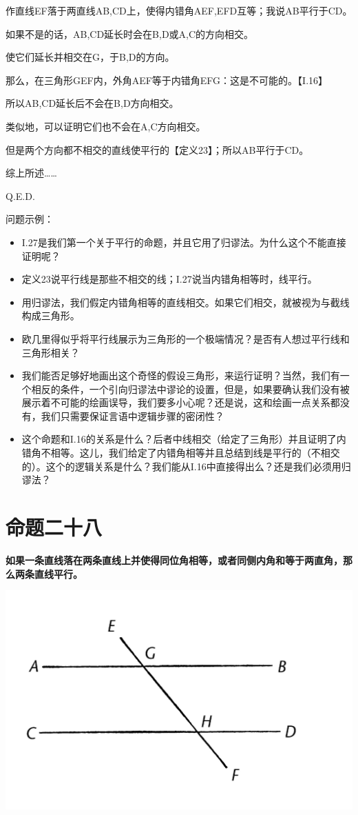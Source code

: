 \documentclass[
]{book}
\providecommand{\tightlist}{%
  \setlength{\itemsep}{0pt}\setlength{\parskip}{0pt}}
\begin{document}
作直线EF落于两直线AB,CD上，使得内错角AEF,EFD互等；我说AB平行于CD。

如果不是的话，AB,CD延长时会在B,D或A,C的方向相交。

使它们延长并相交在G，于B,D的方向。

那么，在三角形GEF内，外角AEF等于内错角EFG：这是不可能的。【I.16】

所以AB,CD延长后不会在B,D方向相交。

类似地，可以证明它们也不会在A,C方向相交。

但是两个方向都不相交的直线使平行的【定义23】；所以AB平行于CD。

综上所述\ldots\ldots{}

Q.E.D.

问题示例：

\begin{itemize}
\tightlist
\item
  I.27是我们第一个关于平行的命题，并且它用了归谬法。为什么这个不能直接证明呢？
\item
  定义23说平行线是那些不相交的线；I.27说当内错角相等时，线平行。
\item
  用归谬法，我们假定内错角相等的直线相交。如果它们相交，就被视为与截线构成三角形。
\item
  欧几里得似乎将平行线展示为三角形的一个极端情况？是否有人想过平行线和三角形相关？
\item
  我们能否足够好地画出这个奇怪的假设三角形，来运行证明？当然，我们有一个相反的条件，一个引向归谬法中谬论的设置，但是，如果要确认我们没有被展示着不可能的绘画误导，我们要多小心呢？还是说，这和绘画一点关系都没有，我们只需要保证言语中逻辑步骤的密闭性？
\item
  这个命题和I.16的关系是什么？后者中线相交（给定了三角形）并且证明了内错角不相等。这儿，我们给定了内错角相等并且总结到线是平行的（不相交的）。这个的逻辑关系是什么？我们能从I.16中直接得出么？还是我们必须用归谬法？
\end{itemize}

\hypertarget{ux547dux9898ux4e8cux5341ux516b}{%
\section{命题二十八}\label{ux547dux9898ux4e8cux5341ux516b}}

\textbf{如果一条直线落在两条直线上并使得同位角相等，或者同侧内角和等于两直角，那么两条直线平行。}

\includegraphics[width=0.5\linewidth]{./image/img511}
\end{document}
